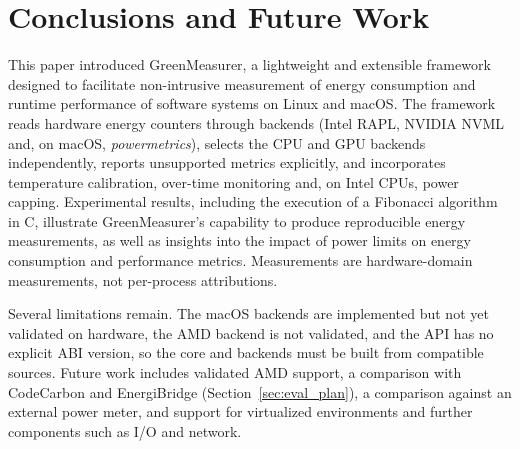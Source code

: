 \section{Conclusions and Future Work}
\label{conc_section}

This paper introduced GreenMeasurer, a lightweight and extensible framework designed to facilitate non-intrusive measurement of energy consumption and runtime performance of software systems on Linux and macOS. The framework reads hardware energy counters through backends (Intel RAPL, NVIDIA NVML and, on macOS, \textit{powermetrics}), selects the CPU and GPU backends independently, reports unsupported metrics explicitly, and incorporates temperature calibration, over-time monitoring and, on Intel CPUs, power capping. Experimental results, including the execution of a Fibonacci algorithm in C, illustrate GreenMeasurer's capability to produce reproducible energy measurements, as well as insights into the impact of power limits on energy consumption and performance metrics. Measurements are hardware-domain measurements, not per-process attributions.

Several limitations remain. The macOS backends are implemented but not yet validated on hardware, the AMD backend is not validated, and the API has no explicit ABI version, so the core and backends must be built from compatible sources. Future work includes validated AMD support, a comparison with CodeCarbon and EnergiBridge (Section~\ref{sec:eval_plan}), a comparison against an external power meter, and support for virtualized environments and further components such as I/O and network.
